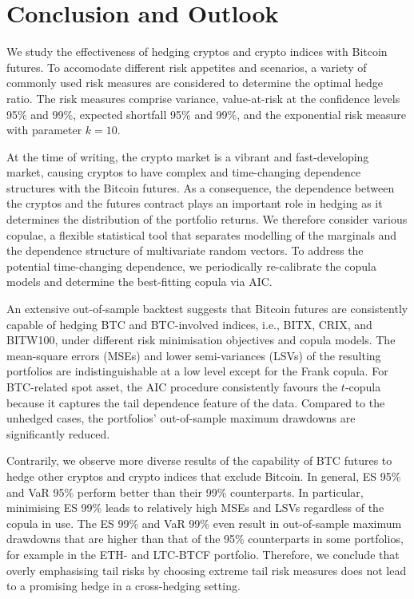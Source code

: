 \section{Conclusion and Outlook}\label{sec:conclusion-and-outlook}
We study the effectiveness of hedging cryptos and crypto indices with
Bitcoin futures.
To accomodate different risk appetites and scenarios, a variety of
commonly used risk measures are considered to determine the optimal
hedge ratio. The risk measures comprise variance, value-at-risk at
the confidence levels 95\% and 99\%, expected shortfall 95\% and 99\%,
and the exponential risk measure with parameter $k=10$.

At the time of writing, the crypto market is a vibrant and
fast-developing market, causing cryptos to have complex and
time-changing dependence structures with the Bitcoin futures.
As a consequence, the dependence between the cryptos and the futures
contract plays an important role in hedging as it determines the
distribution of the portfolio returns. We therefore consider various
copulae, a flexible statistical tool that separates modelling of the
marginals and the dependence structure of multivariate random
vectors. To address the potential time-changing dependence, we
periodically re-calibrate the copula models and determine the
best-fitting copula via AIC. 

An extensive out-of-sample backtest suggests that Bitcoin futures
are consistently capable of hedging BTC and BTC-involved indices,
i.e., BITX, CRIX, and BITW100, under different risk minimisation
objectives 
and copula models. The mean-square errors (MSEs) and lower
semi-variances (LSVs) of the resulting portfolios are
indistinguishable at a low level except for the Frank copula. 
For BTC-related spot asset, the AIC procedure consistently
favours the $t$-copula because it  
captures the tail dependence feature of the data. 
Compared to the unhedged cases, the
portfolios' out-of-sample maximum drawdowns are significantly reduced. 

Contrarily, we observe more diverse results of the capability of BTC
futures to hedge other cryptos and crypto indices that exclude Bitcoin. 
In general, ES 95\% and VaR 95\% perform better than their 99\%
counterparts. In particular, minimising ES 99\% leads to relatively
high MSEs and LSVs regardless of the copula in use. The ES 99\% and
VaR 99\% even result in out-of-sample maximum drawdowns that are
higher than that of the 95\% counterparts in some portfolios, 
for example in the ETH- and LTC-BTCF portfolio.
Therefore, we conclude that overly emphasising tail risks by choosing
extreme tail risk measures does not lead to a promising hedge in a
cross-hedging setting. 

